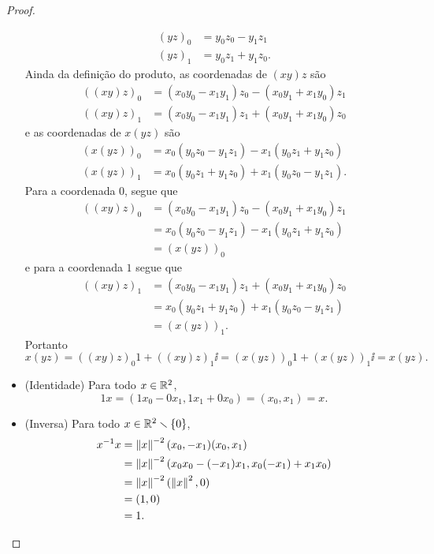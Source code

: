 \begin{proof}
\begin{itemize}
\begin{align*}
		(yz)_0 &= y_0z_0 - y_1z_1 \\
		(yz)_1 &= y_0z_1 + y_1z_0.
		\end{align*}
	Ainda da definição do produto, as coordenadas de $(xy)z$ são
		\begin{align*}
		((xy)z)_0 &= (x_0y_0 - x_1y_1)z_0 - (x_0y_1 + x_1y_0)z_1 \\
		((xy)z)_1 &= (x_0y_0 - x_1y_1)z_1 + (x_0y_1 + x_1y_0)z_0
		\end{align*}
	e as coordenadas de $x(yz)$ são
		\begin{align*}
		(x(yz))_0 &= x_0(y_0z_0-y_1z_1) - x_1(y_0z_1+y_1z_0) \\
		(x(yz))_1 &= x_0(y_0z_1+y_1z_0) + x_1(y_0z_0-y_1z_1).
		\end{align*}
	Para a coordenada $0$, segue que
		\begin{align*}
		((xy)z)_0 &= (x_0y_0 - x_1y_1)z_0 - (x_0y_1 + x_1y_0)z_1 \\
			&= x_0(y_0z_0-y_1z_1) - x_1(y_0z_1+y_1z_0) \\
			&= (x(yz))_0
		\end{align*}
	e para a coordenada $1$ segue que
		\begin{align*}
		((xy)z)_1 &= (x_0y_0 - x_1y_1)z_1 + (x_0y_1 + x_1y_0)z_0 \\
			&= x_0(y_0z_1+y_1z_0) + x_1(y_0z_0-y_1z_1) \\
			&= (x(yz))_1.
		\end{align*}
	Portanto
		\begin{equation*}
		x(yz) = ((xy)z)_0 1 + ((xy)z)_1 \ii = (x(yz))_0 1 + (x(yz))_1 \ii = x(yz).
		\end{equation*}
	\item (Identidade) Para todo $x \in \mathbb{R}^2$,
		\begin{equation*}
		1x = (1x_0-0x_1,1x_1+0x_0) = (x_0,x_1) = x.
		\end{equation*}
	\item (Inversa) Para todo $x \in \mathbb{R}^2 \smallsetminus \{0\}$,
		\begin{align*}
		x^{-1} x &= \left\Vert{x}\right\Vert^{-2}(x_0,-x_1)(x_0,x_1) \\
			&= \left\Vert{x}\right\Vert^{-2} (x_0x_0 - (-x_1)x_1,x_0(-x_1)+x_1x_0) \\
			&= \left\Vert{x}\right\Vert^{-2} (\left\Vert{x}\right\Vert^2,0) \\
			&= (1,0) \\
			&= 1.
			\qedhere
		\end{align*}
\end{itemize}
\end{proof}

